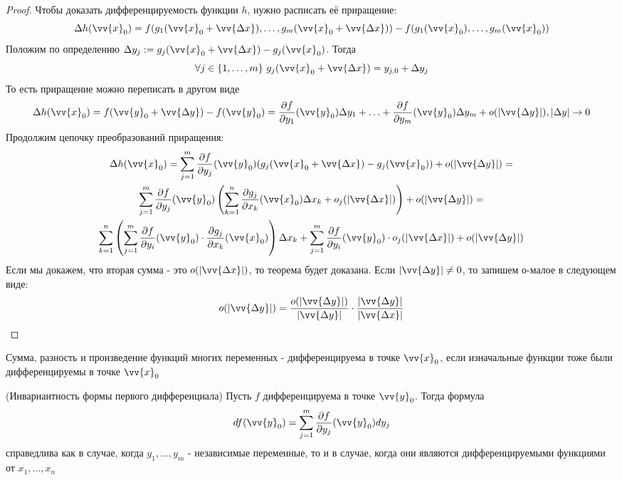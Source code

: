 \begin{proof}
	Чтобы доказать дифференцируемость функции $h$, нужно расписать её приращение:
	\[
		\Delta h(\vv{x}_0) = f(g_1(\vv{x}_0 + \vv{\Delta x}), \ldots, g_m(\vv{x}_0 + \vv{\Delta x})) - f(g_1(\vv{x}_0), \ldots, g_m(\vv{x}_0))
	\]
	Положим по определению $\Delta y_j := g_j(\vv{x}_0 + \vv{\Delta x}) - g_j(\vv{x}_0)$. Тогда
	\[
		\forall j \in \range{m}\ g_j(\vv{x}_0 + \vv{\Delta x}) = y_{j, 0} + \Delta y_j
	\]
	То есть приращение можно переписать в другом виде
	\[
		\Delta h(\vv{x}_0) = f(\vv{y}_0 + \vv{\Delta y}) - f(\vv{y}_0) = \frac{\vdelta f}{\vdelta y_1} (\vv{y}_0) \Delta y_1 + \ldots + \frac{\vdelta f}{\vdelta y_m} (\vv{y}_0) \Delta y_m + o(|\vv{\Delta y}|), |\Delta y| \to 0
	\]
	Продолжим цепочку преобразований приращения:
	\begin{multline*}
		\Delta h(\vv{x}_0) = \suml_{j = 1}^m \pd{f}{y_j}(\vv{y}_0) (g_j(\vv{x}_0 + \vv{\Delta x}) - g_j(\vv{x}_0)) + o(|\vv{\Delta y}|) =
		\\
		\suml_{j = 1}^m \frac{\vdelta f}{\vdelta y_j} (\vv{y}_0) \left(\suml_{k = 1}^n \frac{\vdelta g_j}{\vdelta x_k} (\vv{x}_0) \Delta x_k + o_j(|\vv{\Delta x}|)\right) + o(|\vv{\Delta y}|) =
		\\
		\suml_{k = 1}^n \left(\suml_{j = 1}^m \frac{\vdelta f}{\vdelta y_i} (\vv{y}_0) \cdot \frac{\vdelta g_j}{\vdelta x_k} (\vv{x}_0)\right) \Delta x_k + \suml_{j = 1}^m \frac{\vdelta f}{\vdelta y_i} (\vv{y}_0) \cdot o_j(|\vv{\Delta x}|) + o(|\vv{\Delta y}|)
	\end{multline*}
	Если мы докажем, что вторая сумма - это $o(|\vv{\Delta x}|)$, то теорема будет доказана. Если $|\vv{\Delta y}| \neq 0$, то запишем о-малое в следующем виде:
	\[
		o(|\vv{\Delta y}|) = \frac{o(|\vv{\Delta y}|)}{|\vv{\Delta y}|} \cdot \frac{|\vv{\Delta y}|}{|\vv{\Delta x}|}
	\]
\end{proof}

\begin{corollary}
	Сумма, разность и произведение функций многих переменных - дифференцируема в точке $\vv{x}_0$, если изначальные функции тоже были дифференцируемы в точке $\vv{x}_0$
\end{corollary}

\begin{corollary} (Инвариантность формы первого дифференциала)
	Пусть $f$ дифференцируема в точке $\vv{y}_0$. Тогда формула
	\[
		df(\vv{y}_0) = \suml_{j = 1}^m \frac{\vdelta f}{\vdelta y_j} (\vv{y}_0) dy_j
	\]
	справедлива как в случае, когда $y_1, \ldots, y_m$ - независимые переменные, то и в случае, когда они являются дифференцируемыми функциями от $x_1, \ldots, x_n$
\end{corollary}


